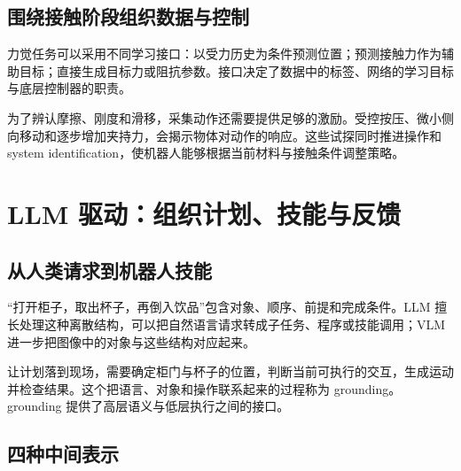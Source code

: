 \documentclass[UTF8,a4paper,11pt,oneside,openany,fontset=none]{ctexbook}
\begin{document}
\section{围绕接触阶段组织数据与控制}

力觉任务可以采用不同学习接口：以受力历史为条件预测位置；预测接触力作为辅助目标；直接生成目标力或阻抗参数。接口决定了数据中的标签、网络的学习目标与底层控制器的职责。

为了辨认摩擦、刚度和滑移，采集动作还需要提供足够的激励。受控按压、微小侧向移动和逐步增加夹持力，会揭示物体对动作的响应。这些试探同时推进操作和 system identification，使机器人能够根据当前材料与接触条件调整策略。

\chapter{LLM 驱动：组织计划、技能与反馈}

\section{从人类请求到机器人技能}

``打开柜子，取出杯子，再倒入饮品''包含对象、顺序、前提和完成条件。LLM 擅长处理这种离散结构，可以把自然语言请求转成子任务、程序或技能调用；VLM 进一步把图像中的对象与这些结构对应起来。

让计划落到现场，需要确定柜门与杯子的位置，判断当前可执行的交互，生成运动并检查结果。这个把语言、对象和操作联系起来的过程称为 grounding。grounding 提供了高层语义与低层执行之间的接口。

\section{四种中间表示}
\end{document}
